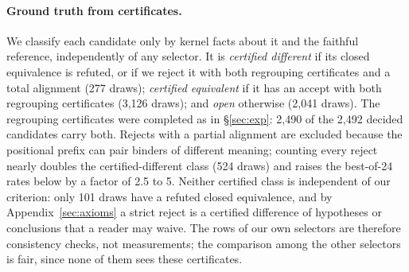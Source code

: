 \documentclass[10pt]{article}
\theoremstyle{definition}
\begin{document}
\paragraph{Ground truth from certificates.} We classify each candidate only by kernel facts
about it and the faithful reference, independently of any selector. It is \emph{certified
different} if its closed equivalence is refuted, or if we reject it with both regrouping
certificates and a total alignment (277 draws); \emph{certified equivalent} if it has an
accept with both regrouping certificates (3,126 draws); and \emph{open} otherwise (2,041 draws).
The regrouping certificates were completed as in \S\ref{sec:exp}: 2,490 of the 2,492 decided
candidates carry both. Rejects with a partial alignment are excluded because the positional prefix
can pair binders of different meaning; counting every reject nearly doubles the certified-different
class (524 draws) and raises the best-of-24 rates below by a factor of 2.5 to 5. Neither certified class is independent of our criterion:
only 101 draws have a refuted closed equivalence, and by Appendix~\ref{sec:axioms} a strict
reject is a certified difference of hypotheses or conclusions that a reader may waive. The rows
of our own selectors are therefore consistency checks, not measurements; the comparison among
the other selectors is fair, since none of them sees these certificates.
\end{document}
